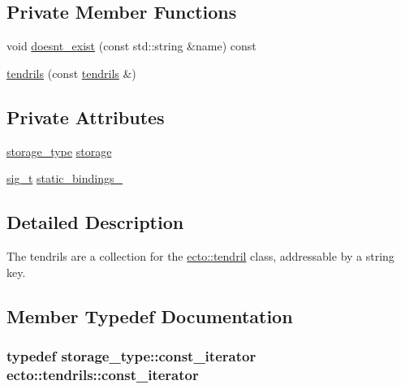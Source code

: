 \subsection*{Private Member Functions}
\begin{DoxyCompactItemize}
\item 
void \hyperlink{classecto_1_1tendrils_aa33d16327157994060a8051d2bbe018e}{doesnt\+\_\+exist} (const std\+::string \&name) const 
\item 
\hyperlink{classecto_1_1tendrils_a7ee52bb996bd2ec581ff2008dea341dc}{tendrils} (const \hyperlink{classecto_1_1tendrils}{tendrils} \&)
\end{DoxyCompactItemize}
\subsection*{Private Attributes}
\begin{DoxyCompactItemize}
\item 
\hyperlink{classecto_1_1tendrils_a3647503829f1b29de220584d265c63fb}{storage\+\_\+type} \hyperlink{classecto_1_1tendrils_afaa587298937ffa94ccfefc8a97b4edc}{storage}
\item 
\hyperlink{classecto_1_1tendrils_aca7990b4d8ccfbddfb4d5c805345ca23}{sig\+\_\+t} \hyperlink{classecto_1_1tendrils_a40635d009ae082dccde9486c1293212e}{static\+\_\+bindings\+\_\+}
\end{DoxyCompactItemize}


\subsection{Detailed Description}
The tendrils are a collection for the \hyperlink{classecto_1_1tendril}{ecto\+::tendril} class, addressable by a string key. 

\subsection{Member Typedef Documentation}
\hypertarget{classecto_1_1tendrils_a86df9983555ca4ebdae8b1d36aa4bbd8}{}
\subsubsection[{const\+\_\+iterator}]{\setlength{\rightskip}{0pt plus 5cm}typedef storage\+\_\+type\+::const\+\_\+iterator {\bf ecto\+::tendrils\+::const\+\_\+iterator}}\label{classecto_1_1tendrils_a86df9983555ca4ebdae8b1d36aa4bbd8}
\hypertarget{classecto_1_1tendrils_a919b9a4666ad641148b6a432a1fd08fb}{}
